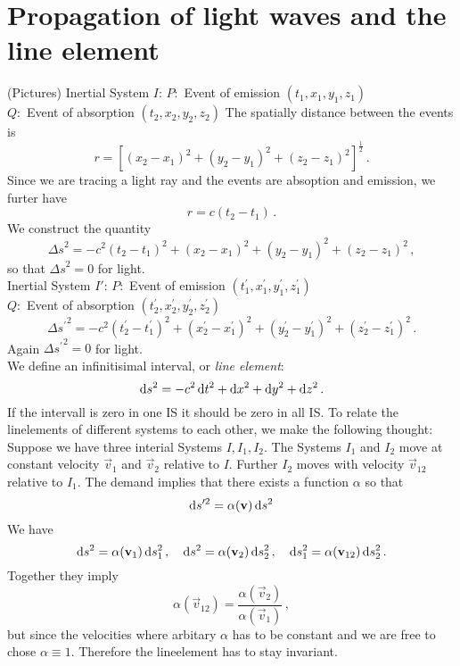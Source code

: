 \section{Propagation of light waves and the line element}
(Pictures)
Inertial System $I$:
$P:$ Event of emission $(t_1,x_1,y_1,z_1)$\\
$Q:$ Event of absorption $(t_2,x_2,y_2,z_2)$
The spatially distance between the events is
\begin{equation}
r=\left[(x_2-x_1)^2+(y_2-y_1)^2+(z_2-z_1)^2\right]^{\frac{1}{2}}\, .
\end{equation}
Since we are tracing a light ray and the events are absoption and emission, we
furter have
\begin{equation}
r=c(t_2-t_1)\, .
\end{equation}
We construct the quantity
\begin{equation}
{\Delta s}^2=-c^2(t_2-t_1)^2+(x_2-x_1)^2+(y_2-y_1)^2+(z_2-z_1)^2\, ,
\end{equation}
so that ${\Delta s}^2=0$ for light.\\
Inertial System $I'$:
$P:$ Event of emission $(t_1^\prime,x_1^\prime,y_1^\prime,z_1^\prime)$\\
$Q:$ Event of absorption $(t_2^\prime,x_2^\prime,y_2^\prime,z_2^\prime)$
\begin{equation}
{\Delta
s^\prime}^2=-c^2\left(t^\prime_2-t^\prime_1\right)^2
+\left(x^\prime_2-x^\prime_1\right)^2
+\left(y^\prime_2-y^\prime_1\right)^2
+\left(z^\prime_2-z^\prime_1\right)^2\,.
\end{equation}
Again ${\Delta s^\prime}^2=0$ for light.\\
We define an infinitisimal interval, or \emph{line element}:
\begin{equation}
\dif s^2=-c^2\dif t^2+\dif x^2+\dif y^2+\dif z^2\, .
\end{equation}
If the intervall is zero in one IS it should be zero in all IS. To relate the
linelements of different systems to each other, we make the following thought:
Suppose we have three interial Systems $I,I_1,I_2$.
The Systems $I_1$ and $I_2$ move at constant velocity $\vec{v}_1$ and $\vec{v}_2$ relative to $I$. Further
$I_2$ moves with velocity $\vec{v}_{12}$ relative to $I_1$. The demand implies
that there exists a function $\alpha$ so that
\begin{equation}
\dif s'^2=\alpha(\vec{v})\dif s^2
\end{equation}
We have
\begin{equation}
\dif s^2=\alpha(\vec{v}_1)\dif s_1^2\, ,\quad\dif s^2=\alpha(\vec{v}_2)\dif
s_2^2\, ,\quad\dif s_1^2=\alpha(\vec{v}_{12})\dif s_2^2\, .
\end{equation}
Together they imply
\begin{equation}
\alpha(\vec{v}_{12})=\frac{\alpha(\vec{v}_{2})}{\alpha(\vec{v}_{1})}\, ,
\end{equation}
but since the velocities where arbitary $\alpha$ has to be constant and we are
free to chose $\alpha\equiv 1$. Therefore the lineelement has to stay invariant.
